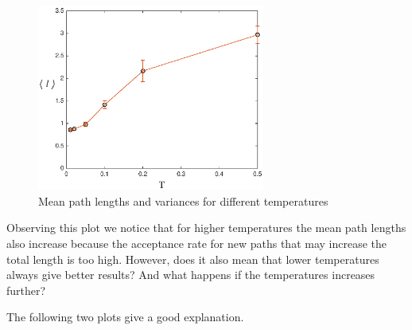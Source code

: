 \documentclass[a4paper]{article}
\begin{document}
\begin{figure}[!htbp]
\begin{center}
\includegraphics[width=7.5cm]{plot1_v2.eps}
\end{center}
\caption{Mean path lengths and variances for different temperatures}
\end{figure}

Observing this plot we notice that for higher temperatures the mean path lengths also increase because the acceptance rate for new paths that may increase the total length is too high. However, does it also mean that lower temperatures always give better results? And what happens if the temperatures increases further?

The following two plots give a good explanation.
\end{document}

